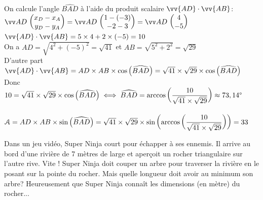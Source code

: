 \documentclass[11pt,a4paper]{article}  %
\begin{document}
\begin{enumMet}
\begin{corrBox}
			On calcule l'angle $\widehat{BAD}$ à l'aide du produit scalaire $\vv{AD}\cdot\vv{AB}$:
			$\Coord{AD}{x_D-x_A}{y_D-y_A}=\Coord{AD}{1-(-3)}{-2-3}=\Coord{AD}{4}{-5}$\\
			$\vv{AD}\cdot\vv{AB}=5\times 4+2\times (-5)=10$\\
			On a $AD= \sqrt{4^2+(-5)^2}=\sqrt{41}$ et $AB= \sqrt{5^2+2^2}=\sqrt{29}$ \\
			D'autre part $\vv{AD}\cdot\vv{AB}=AD\times AB\times \cos\left(\widehat{BAD}\right)=\sqrt{41}\times \sqrt{29}\times \cos\left(\widehat{BAD}\right)$\\
			Donc $10=\sqrt{41}\times \sqrt{29}\times \cos\left(\widehat{BAD}\right) \iff \widehat{BAD} = \arccos\left(\dfrac{10}{\sqrt{41}\times \sqrt{29}}\right)\approx73,14\degree$\\
			\ \\
			$\EuScript{A}=AD\times AB\times \sin\left(\widehat{BAD}\right)=\sqrt{41}\times \sqrt{29}\times \sin\left(\arccos\left(\dfrac{10}{\sqrt{41}\times \sqrt{29}}\right)\right)=33$
		\end{corrBox}
\end{enumMet}


Dans un jeu vidéo, Super Ninja court pour échapper à ses ennemis. Il arrive au bord d'une rivière de 7 mètres de large et aperçoit un rocher triangulaire sur l'autre rive. Vite ! Super Ninja doit couper un arbre pour traverser la rivière en le posant sur la pointe du rocher. Mais quelle longueur doit avoir au minimum son arbre? Heureusement que Super Ninja connaît les dimensions (en mètre) du rocher...
\end{document}

